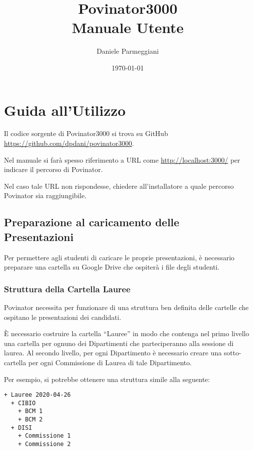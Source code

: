 \documentclass[12pt]{report}
\title{Povinator3000 \\

{\Large Manuale Utente}}
\author{Daniele Parmeggiani}
\date{\today}
\begin{document}
\maketitle
{}
\tableofcontents

\chapter{Guida all'Utilizzo}

Il codice sorgente di Povinator3000 si trova su GitHub \url{https://github.com/dpdani/povinator3000}.

Nel manuale si farà spesso riferimento a URL come \url{http://localhost:3000/} per indicare il percorso di Povinator.

Nel caso tale URL non rispondesse, chiedere all'installatore a quale percorso Povinator sia raggiungibile.

\section{Preparazione al caricamento delle
Presentazioni}\label{preparazione-al-caricamento-delle-presentazioni}

Per permettere agli studenti di caricare le proprie presentazioni, è necessario preparare una cartella su Google Drive che ospiterà i file degli studenti.

\subsection{Struttura della Cartella Lauree}\label{struttura-della-cartella-lauree}

Povinator necessita per funzionare di una struttura ben definita delle cartelle che ospitano le presentazioni dei candidati.

È necessario costruire la cartella ``Lauree'' in modo che contenga nel primo livello una cartella per ognuno dei Dipartimenti che parteciperanno alla sessione di laurea.
Al secondo livello, per ogni Dipartimento è necessario creare una sotto-cartella per ogni Commissione di Laurea di tale Dipartimento.

Per esempio, si potrebbe ottenere una struttura simile alla seguente:

\begin{samepage}
\begin{verbatim}
+ Lauree 2020-04-26
  + CIBIO
    + BCM 1
    + BCM 2
  + DISI
    + Commissione 1
    + Commissione 2
\end{verbatim}
\end{samepage}
\end{document}
